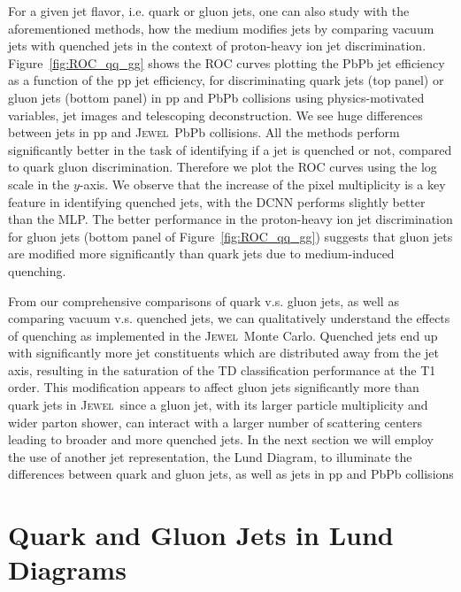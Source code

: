 \documentclass[notoc,preprintnumbers]{JHEP3}
\newcommand{\jw}{\textsc{Jewel}~}
\begin{document}
For a given jet flavor, i.e. quark or gluon jets, one can also study with the aforementioned methods, how the medium modifies jets by comparing vacuum jets with quenched jets in the context of proton-heavy ion jet discrimination. Figure~\ref{fig:ROC_qq_gg} shows the ROC curves plotting the PbPb jet efficiency as a function of the pp jet efficiency, for discriminating quark jets (top panel) or gluon jets (bottom panel) in pp and PbPb collisions using physics-motivated variables, jet images and telescoping deconstruction. We see huge differences between jets in pp and \jw PbPb collisions. All the methods perform significantly better in the task of identifying if a jet is quenched or not, compared to quark gluon discrimination. Therefore we plot the ROC curves using the log scale in the $y$-axis. We observe that the increase of the pixel multiplicity is a key feature in identifying quenched jets, with the DCNN performs slightly better than the MLP. The better performance in the proton-heavy ion jet discrimination for gluon jets (bottom panel of Figure~\ref{fig:ROC_qq_gg}) suggests that gluon jets are modified more significantly than quark jets due to medium-induced quenching.

From our comprehensive comparisons of quark v.s. gluon jets, as well as comparing vacuum v.s. quenched jets, we can qualitatively understand the effects of quenching as implemented in the \jw Monte Carlo. Quenched jets end up with significantly more jet constituents which are distributed away from the jet axis, resulting in the saturation of the TD classification performance at the T1 order. This modification appears to affect gluon jets significantly more than quark jets in \jw since a gluon jet, with its larger particle multiplicity and wider parton shower, can interact with a larger number of scattering centers leading to broader and more quenched jets. In the next section we will employ the use of another jet representation, the Lund Diagram, to illuminate the differences between quark and gluon jets, as well as jets in pp and PbPb collisions

\section{Quark and Gluon Jets in Lund Diagrams}
\label{sec:lund}
\end{document}
